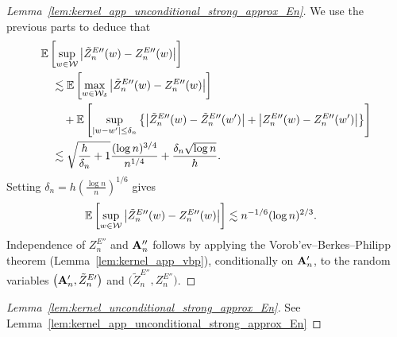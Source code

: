 \begin{proof}[Lemma~\ref{lem:kernel_app_unconditional_strong_approx_En}]
  We use the previous parts to deduce that
  \begin{align*}
    &\mathbb{E}\left[
      \sup_{w \in \mathcal{W}}
      \big|\tilde Z_n^{E\prime\prime}(w) - Z_n^{E\prime\prime}(w)\big|
    \right] \\
    &\quad\lesssim
    \mathbb{E}\left[
      \max_{w \in \mathcal{W}_\delta}
      \big|\tilde Z_n^{E\prime\prime}(w) - Z_n^{E\prime\prime}(w)\big|
    \right] \\
    &\qquad+
    \mathbb{E}\left[
      \sup_{|w-w'| \leq \delta_n}
      \left\{
        \big|\tilde Z_n^{E\prime\prime}(w) - \tilde Z_n^{E\prime\prime}(w')\big|
        + \big|Z_n^{E\prime\prime}(w) - Z_n^{E\prime\prime}(w')\big|
      \right\}
    \right] \\
    &\quad\lesssim
    \sqrt{\frac{h}{\delta_n} + 1}
    \frac{(\log n)^{3/4}}{n^{1/4}}
    + \frac{\delta_n \sqrt{\log n}}{h}.
  \end{align*}
  Setting
  $\delta_n = h \left( \frac{\log n}{n} \right)^{1/6}$
  gives
  \begin{align*}
    \mathbb{E}\left[
      \sup_{w \in \mathcal{W}}
      \big|\tilde Z_n^{E\prime\prime}(w) - Z_n^{E\prime\prime}(w)\big|
    \right]
    &\lesssim
    n^{-1/6} (\log n)^{2/3}.
  \end{align*}
  Independence of $Z_n^{E\dprime}$ and $\mathbf{A}_n''$
  follows by applying the
  Vorob'ev--Berkes--Philipp theorem (Lemma~\ref{lem:kernel_app_vbp}),
  conditionally on $\mathbf{A}_n'$, to the random variables
  $\big(\mathbf{A}_n', \tilde Z_n^{E\prime}\big)$ and
  $\big(\tilde Z_n^{E\dprime}, Z_n^{E\dprime}\big)$.
\end{proof}

\begin{proof}[Lemma~\ref{lem:kernel_unconditional_strong_approx_En}]
  See Lemma~\ref{lem:kernel_app_unconditional_strong_approx_En}
\end{proof}

